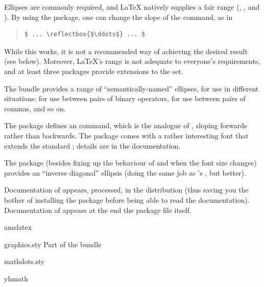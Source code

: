 
Ellipses are commonly required, and \LaTeX{} natively supplies a fair
range (, ,  and ).  By using
the  package, one can change the slope of the
 command, as in
\begin{quote}
\begin{verbatim}
$ ... \reflectbox{$\ddots$} ... $
\end{verbatim}
\end{quote}
While this works, it is not a recommended way of achieving the desired
result (see below).  Moreover, \LaTeX{}'s range is not adequate to
everyone's requirements, and at least three packages provide
extensions to the set.

The \AMSLaTeX{} bundle provides a range of ``semantically-named''
ellipses, for use in different situations:  for use between
pairs of binary operators,  for use between pairs of commas,
and so on.

The  package defines an  command, which is
the analogue of , sloping forwards rather than backwards.
The  package comes with a rather interesting font that
extends the standard ; details are in the documentation.

The  package (besides fixing up the behaviour of
\AllTeX{}  and  when the font size changes)
provides an ``inverse diagonal'' ellipsis  (doing the same
job as 's , but better).

Documentation of  appears, processed, in the
distribution (thus saving you the bother of installing the package
before being able to read the documentation).  Documentation of
 appears at the end the package file itself.
\begin{ctanrefs}
\item[amslatex]
\item[graphics.sty]Part of the  bundle
\item[mathdots.sty]
\item[yhmath]
\end{ctanrefs}


